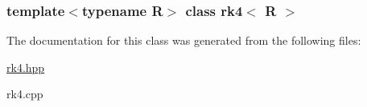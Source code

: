 \subsubsection*{template$<$typename R$>$ class rk4$<$ R $>$}



The documentation for this class was generated from the following files:\begin{DoxyCompactItemize}
\item 
\hyperlink{rk4_8hpp}{rk4.hpp}\item 
rk4.cpp\end{DoxyCompactItemize}

